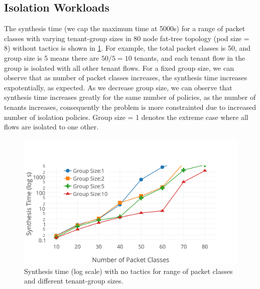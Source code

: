 \subsection{Isolation Workloads}
The synthesis time (we cap the maximum time at 5000s) for a range of
 packet classes with varying tenant-group sizes in 80 node fat-tree topology (pod size = 8) 
 without tactics is shown in \cref{fig:no-tactic}. For example, the total packet classes is 50, and group size is 5 means there
  are $50/5 = 10$ tenants, and each tenant flow in the group is isolated with all other tenant
   flows. For a fixed group size, we can observe that as number of packet classes increases,
    the synthesis time increases expotentially, as expected. As we decrease group size,
     we can observe that synthesis time increases greatly for the same number of policies,
      as the number of tenants increases, consequently the problem is more constrainted 
      due to increased number of isolation policies. 
      Group size = 1 denotes the extreme case where all flows are isolated to one other. 
      


\begin{figure}[H]
	\includegraphics[width=\columnwidth]{figures/no-tactic-isolation-plot.png}
	\caption{Synthesis time (log scale) with no tactics for range of packet classes and different tenant-group sizes.}
	\label{fig:no-tactic}
\end{figure}

